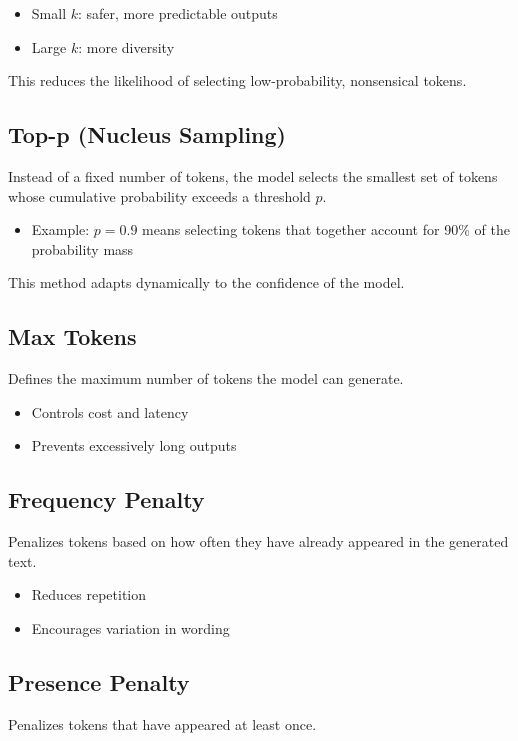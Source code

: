 \documentclass[10pt,a4paper]{article}
\begin{document}
\begin{itemize}
    \item Small $k$: safer, more predictable outputs
    \item Large $k$: more diversity
\end{itemize}

This reduces the likelihood of selecting low-probability, nonsensical tokens.

\subsection{Top-p (Nucleus Sampling)}
Instead of a fixed number of tokens, the model selects the smallest set of tokens whose cumulative probability exceeds a threshold $p$.

\begin{itemize}
    \item Example: $p = 0.9$ means selecting tokens that together account for 90\% of the probability mass
\end{itemize}

This method adapts dynamically to the confidence of the model.

\subsection{Max Tokens}
Defines the maximum number of tokens the model can generate.

\begin{itemize}
    \item Controls cost and latency
    \item Prevents excessively long outputs
\end{itemize}

\subsection{Frequency Penalty}
Penalizes tokens based on how often they have already appeared in the generated text.

\begin{itemize}
    \item Reduces repetition
    \item Encourages variation in wording
\end{itemize}

\subsection{Presence Penalty}
Penalizes tokens that have appeared at least once.
\end{document}
